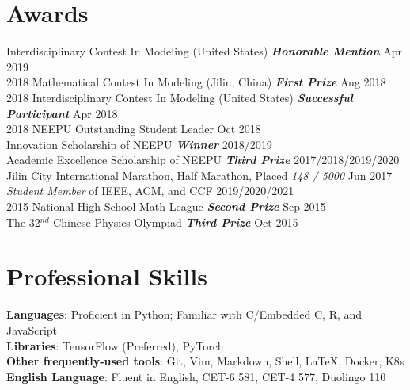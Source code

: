 \documentclass{my_cv}
\begin{document}
\hspace*{\fill} 

\section{Awards}
 Interdisciplinary Contest In Modeling (United States) \textbf{\emph{Honorable Mention}} \hfill Apr 2019\\
2018 Mathematical Contest In Modeling (Jilin, China) \textbf{\emph{First Prize}} \hfill Aug 2018\\
2018 Interdisciplinary Contest In Modeling (United States) \textbf{\emph{Successful Participant}} \hfill Apr 2018\\
2018 NEEPU Outstanding Student Leader \hfill Oct 2018\\
Innovation Scholarship of NEEPU \textbf{\emph{Winner}} \hfill 2018/2019\\
Academic Excellence Scholarship of NEEPU \textbf{\emph{Third Prize}} \hfill 2017/2018/2019/2020 \\
Jilin City International Marathon, Half Marathon, Placed \emph{148 / 5000} \hfill Jun 2017\\
\emph{Student Member} of IEEE, ACM, and CCF \hfill 2019/2020/2021\\
2015 National High School Math League \textbf{\emph{Second Prize}} \hfill Sep 2015\\
The 32$^{nd}$ Chinese Physics Olympiad \textbf{\emph{Third Prize}} \hfill Oct 2015

\hspace*{\fill}

\section{Professional Skills}
\noindent \textbf{Languages}: Proficient in Python; Familiar with C/Embedded C, R, and JavaScript \\
\textbf{Libraries}: TensorFlow (Preferred), PyTorch \\
\textbf{Other frequently-used tools}: Git, Vim, Markdown, Shell, \LaTeX, Docker, K8s \\
\textbf{English Language}: Fluent in English, CET-6 581, CET-4 577, Duolingo 110
\end{document}

